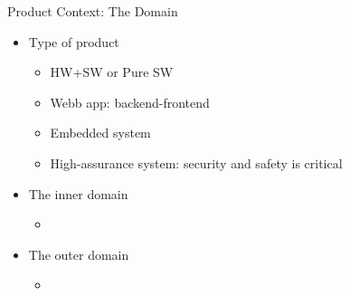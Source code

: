 

\begin{Slide}{Product Context: The Domain}

\begin{itemize}
\item Type of product
\begin{itemize}
\item HW+SW or Pure SW
\item Webb app: backend-frontend
\item Embedded system
\item High-assurance system: security and safety is critical
\end{itemize}
\item The inner domain
\begin{itemize}
\item \TODO{}
\end{itemize}
\item The outer domain
\begin{itemize}
\item \TODO{}

\end{itemize}
\end{itemize}
\end{Slide}